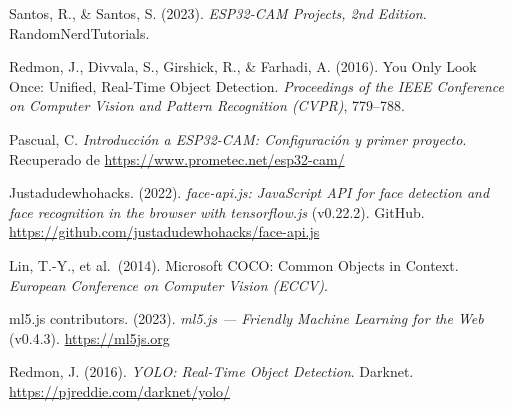 \documentclass[12pt,a4paper]{article}
\begin{document}
\begin{enumerate}[leftmargin=2.5cm, label={[\arabic*]}]
  \item Santos, R., \& Santos, S. (2023). \textit{ESP32-CAM Projects, 2nd Edition}. RandomNerdTutorials.

  \item Redmon, J., Divvala, S., Girshick, R., \& Farhadi, A. (2016). You Only Look Once: Unified, Real-Time Object Detection. \textit{Proceedings of the IEEE Conference on Computer Vision and Pattern Recognition (CVPR)}, 779--788.

  \item Pascual, C. \textit{Introducción a ESP32-CAM: Configuración y primer proyecto}. Recuperado de \url{https://www.prometec.net/esp32-cam/}

  \item Justadudewhohacks. (2022). \textit{face-api.js: JavaScript API for face detection and face recognition in the browser with tensorflow.js} (v0.22.2). GitHub. \url{https://github.com/justadudewhohacks/face-api.js}

  \item Lin, T.-Y., et al.\ (2014). Microsoft COCO: Common Objects in Context. \textit{European Conference on Computer Vision (ECCV)}.

  \item ml5.js contributors. (2023). \textit{ml5.js — Friendly Machine Learning for the Web} (v0.4.3). \url{https://ml5js.org}

  \item Redmon, J. (2016). \textit{YOLO: Real-Time Object Detection}. Darknet. \url{https://pjreddie.com/darknet/yolo/}
\end{enumerate}
\end{document}
